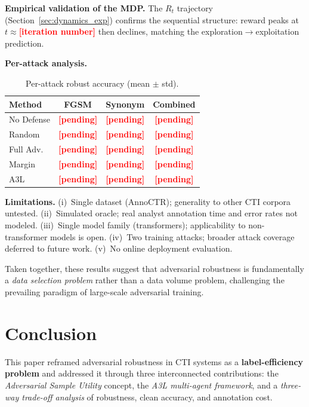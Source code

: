 \documentclass[review,1p,times,number]{elsarticle}
\newcommand{\TODO}[1]{\textcolor{red}{\textbf{[#1]}}}
\begin{document}
\textbf{Empirical validation of the MDP.}
The $R_t$ trajectory (Section~\ref{sec:dynamics_exp}) confirms the
sequential structure: reward peaks at $t{\approx}$\TODO{iteration number} then declines,
matching the exploration$\to$exploitation prediction.

\textbf{Per-attack analysis.}

\begin{table}[htbp]
\caption{Per-attack robust accuracy (mean $\pm$ std).}
\label{tab:perattack}
\centering
\begin{tabular}{@{}lccc@{}}
\toprule
\textbf{Method} & \textbf{FGSM} & \textbf{Synonym} & \textbf{Combined} \\
\midrule
No Defense & \TODO{pending} & \TODO{pending} & \TODO{pending} \\
Random     & \TODO{pending} & \TODO{pending} & \TODO{pending} \\
Full Adv.  & \TODO{pending} & \TODO{pending} & \TODO{pending} \\
Margin     & \TODO{pending} & \TODO{pending} & \TODO{pending} \\
A3L        & \TODO{pending} & \TODO{pending} & \TODO{pending} \\
\bottomrule
\end{tabular}
\end{table}

\textbf{Limitations.}
(i)~Single dataset (AnnoCTR); generality to other CTI corpora
untested.
(ii)~Simulated oracle; real analyst annotation time and error rates
not modeled.
(iii)~Single model family (transformers); applicability to
non-transformer models is open.
(iv)~Two training attacks; broader attack coverage deferred to future
work.
(v)~No online deployment evaluation.

Taken together, these results suggest that adversarial robustness is
fundamentally a \textit{data selection problem} rather than a data
volume problem, challenging the prevailing paradigm of large-scale
adversarial training.
\section{Conclusion}
\label{sec:conclusion}

This paper reframed adversarial robustness in CTI systems as a
\textbf{label-efficiency problem} and addressed it through three interconnected
contributions: the \textit{Adversarial Sample Utility} concept, the
\textit{A3L multi-agent framework}, and a \textit{three-way trade-off analysis}
of robustness, clean accuracy, and annotation cost.
\end{document}
